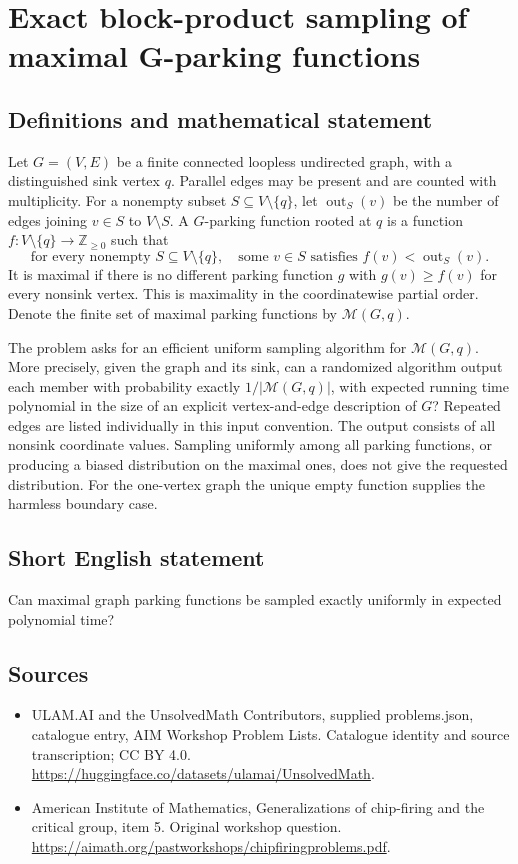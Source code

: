 \documentclass[11pt,a4paper]{article}
\begin{document}
\section*{Exact block-product sampling of maximal G-parking functions}\label{statement}

\subsection{Definitions and mathematical statement}
Let $G=(V,E)$ be a finite connected loopless undirected graph, with a
distinguished sink vertex $q$. Parallel edges may be present and are
counted with multiplicity. For a nonempty subset $S\subseteq V\setminus\{q\}$,
let $\operatorname{out}_S(v)$ be the number of edges joining $v\in S$
to $V\setminus S$. A $G$-parking function rooted at $q$ is a function
$f:V\setminus\{q\}\to\mathbb Z_{\ge0}$ such that
\[
 \text{for every nonempty }S\subseteq V\setminus\{q\},\quad
 \text{some }v\in S\text{ satisfies }f(v)<\operatorname{out}_S(v).
\]
It is maximal if there is no different parking function $g$ with
$g(v)\ge f(v)$ for every nonsink vertex. This is maximality in the
coordinatewise partial order. Denote the finite set of maximal parking
functions by $\mathcal M(G,q)$.

The problem asks for an efficient uniform sampling algorithm for
$\mathcal M(G,q)$. More precisely, given the graph and its sink, can a
randomized algorithm output each member with probability exactly
$1/|\mathcal M(G,q)|$, with expected running time polynomial in the
size of an explicit vertex-and-edge description of $G$? Repeated edges
are listed individually in this input convention. The output consists
of all nonsink coordinate values. Sampling uniformly among all parking
functions, or producing a biased distribution on the maximal ones,
does not give the requested distribution. For the one-vertex graph
the unique empty function supplies the harmless boundary case.
\subsection{Short English statement}
Can maximal graph parking functions be sampled exactly uniformly in expected polynomial time?
\subsection{Sources}
\begin{itemize}
\item[S1] ULAM.AI and the UnsolvedMath Contributors, supplied problems.json, catalogue entry, AIM Workshop Problem Lists. Catalogue identity and source transcription; CC BY 4.0.
\url{https://huggingface.co/datasets/ulamai/UnsolvedMath}.
\item[S2] American Institute of Mathematics, Generalizations of chip-firing and the critical group, item 5. Original workshop question.
\url{https://aimath.org/pastworkshops/chipfiringproblems.pdf}.
\end{itemize}
\end{document}
